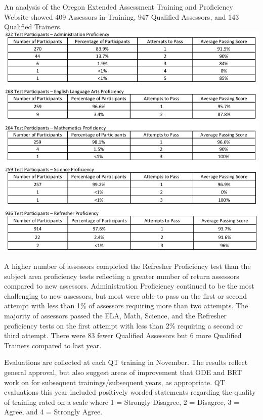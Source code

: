 \documentclass[]{article}
\begin{document}
An analysis of the Oregon Extended Assessment Training and Proficiency
Website showed 409 Assessors in-Training, 947 Qualified Assessors, and
143 Qualified Trainers. \FloatBarrier
\includegraphics{Figures/TestPartic/TestParticipants.png}

A higher number of assessors completed the Refresher Proficiency test
than the subject area proficiency tests reflecting a greater number of
return assessors compared to new assessors. Administration Proficiency
continued to be the most challenging to new assessors, but most were
able to pass on the first or second attempt with less than 1\% of
assessors requiring more than two attempts. The majority of assessors
passed the ELA, Math, Science, and the Refresher proficiency tests on
the first attempt with less than 2\% requiring a second or third
attempt. There were 83 fewer Qualified Assessors but 6 more Qualified
Trainers compared to last year.

Evaluations are collected at each QT training in November. The results
reflect general approval, but also suggest areas of improvement that ODE
and BRT work on for subsequent trainings/subsequent years, as
appropriate. QT evaluations this year included positively worded
statements regarding the quality of training rated on a scale where 1 =
Strongly Disagree, 2 = Disagree, 3 = Agree, and 4 = Strongly Agree.
\end{document}

